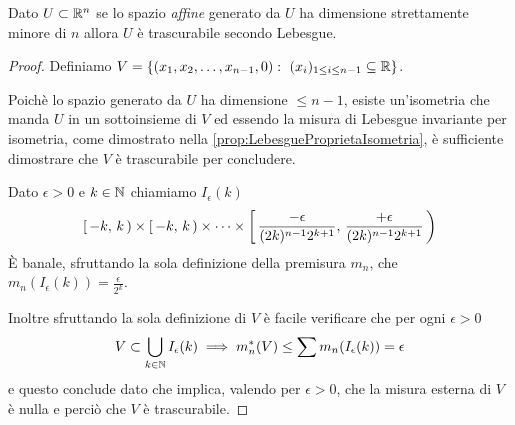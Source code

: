 \begin{proposition}\label{prop:SottospaziTrascurabili}
	Dato $U\subset\mathbb R^n$ se lo spazio \emph{affine} generato da $U$ ha dimensione strettamente minore di $n$ allora $U$ è trascurabile secondo Lebesgue.
\end{proposition}
\begin{proof}
	Definiamo $V=\{(x_1,x_2,\dots,x_{n-1},0):\ (x_i)_{1\le i\le n-1}\subseteq\mathbb R\}$.
	
	Poichè lo spazio generato da $U$ ha dimensione $\le n-1$, esiste un'isometria che manda $U$ in un sottoinsieme di $V$ ed essendo la misura di Lebesgue invariante per isometria, come dimostrato nella \cref{prop:LebesgueProprietaIsometria}, è sufficiente dimostrare che $V$ è trascurabile per concludere.
	
	Dato $\epsilon>0$ e $k\in\mathbb N$ chiamiamo $I_\epsilon(k)$
	\begin{equation*}
		\left[\,-k,\,k\,\right)\times\left[\,-k,\,k\,\right)\times\cdots\times \left[\,\frac{-\epsilon}{(2k)^{n-1}2^{k+1}},\,\frac{+\epsilon}{(2k)^{n-1}2^{k+1}}\,\right)
	\end{equation*}
	È banale, sfruttando la sola definizione della premisura $m_n$, che $m_n(I_\epsilon(k))=\frac{\epsilon}{2^k}$.
	
	Inoltre sfruttando la sola definizione di $V$ è facile verificare che per ogni $\epsilon>0$
	\begin{equation*}
		V\subset\bigcup_{k\in\mathbb N} I_\epsilon(k)\implies m_n^*(V)\le \sum m_n(I_\epsilon(k))=\epsilon
	\end{equation*}
	e questo conclude dato che implica, valendo per $\epsilon>0$, che la misura esterna di $V$ è nulla e perciò che $V$ è trascurabile.
\end{proof}


